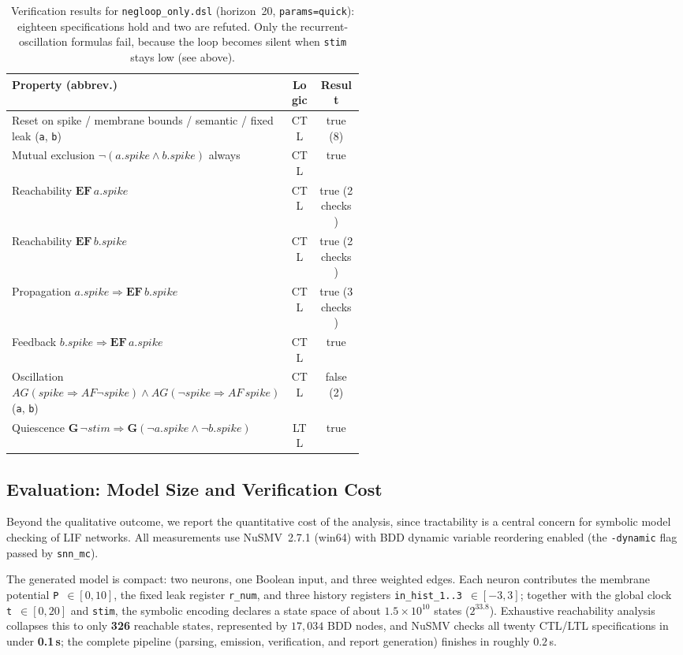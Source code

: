 \documentclass[
]{ceurart}
\begin{document}
\FloatBarrier
\begin{table}[!ht]
\centering
\caption{Verification results for \texttt{negloop\_only.dsl} (horizon~20, \texttt{params=quick}): eighteen specifications hold and two are refuted. Only the recurrent-oscillation formulas fail, because the loop becomes silent when \texttt{stim} stays low (see above).}
\label{tab:case-results}
\small
\begin{tabular}{@{}p{0.52\linewidth}cc@{}}
\toprule
\textbf{Property (abbrev.)} & \textbf{Logic} & \textbf{Result} \\
\midrule
Reset on spike / membrane bounds / semantic / fixed leak (\texttt{a}, \texttt{b}) & CTL & true (8) \\
Mutual exclusion $\neg(a.\mathit{spike} \land b.\mathit{spike})$ always & CTL & true \\
Reachability $\mathbf{EF}\, a.\mathit{spike}$ & CTL & true (2 checks) \\
Reachability $\mathbf{EF}\, b.\mathit{spike}$ & CTL & true (2 checks) \\
Propagation $a.\mathit{spike} \Rightarrow \mathbf{EF}\, b.\mathit{spike}$ & CTL & true (3 checks) \\
Feedback $b.\mathit{spike} \Rightarrow \mathbf{EF}\, a.\mathit{spike}$ & CTL & true \\
Oscillation $AG(spike \Rightarrow AF \lnot spike) \land AG(\lnot spike \Rightarrow AF\, spike)$ (\texttt{a}, \texttt{b}) & CTL & false (2) \\
Quiescence $\mathbf{G}\,\lnot stim \Rightarrow \mathbf{G}(\lnot a.\mathit{spike} \land \lnot b.\mathit{spike})$ & LTL & true \\
\bottomrule
\end{tabular}
\end{table}
\FloatBarrier

\subsection{Evaluation: Model Size and Verification Cost}
\label{subsec:case-eval}

Beyond the qualitative outcome, we report the quantitative cost of the
analysis, since tractability is a central concern for symbolic model
checking of LIF networks. All measurements use NuSMV~2.7.1 (win64) with BDD
dynamic variable reordering enabled (the \texttt{-dynamic} flag passed by
\texttt{snn\_mc}).

The generated model is compact: two neurons, one Boolean input, and three
weighted edges. Each neuron contributes the membrane potential
\texttt{P}~$\in[0,10]$, the fixed leak register \texttt{r\_num}, and three
history registers \texttt{in\_hist\_1..3}~$\in[-3,3]$; together with the
global clock \texttt{t}~$\in[0,20]$ and \texttt{stim}, the symbolic encoding
declares a state space of about $1.5\times 10^{10}$ states ($2^{33.8}$).
Exhaustive reachability analysis collapses this to only \textbf{326}
reachable states, represented by $17{,}034$ BDD nodes, and NuSMV checks all
twenty CTL/LTL specifications in under \textbf{0.1\,s}; the complete pipeline
(parsing, emission, verification, and report generation) finishes in roughly
$0.2$\,s.
\end{document}
